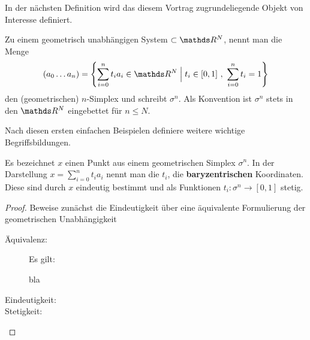 In der nächsten Definition wird das diesem Vortrag zugrundeliegende Objekt von Interesse definiert.

\begin{Def}
  Zu einem geometrisch unabhängigen System \gs $\subset \R^N$, nennt man die Menge
  \begin{gather*}
    (a_0 \ldots a_n) 
      =
    \set{\sum\limits_{i=0}^n t_i a_i \in \R^N}{ t_i \in [0,1] ~,~ \sum\limits_{i=0}^n t_i = 1}
  \end{gather*}
  den (geometrischen) $n$-Simplex und schreibt $\sigma^n$. Als Konvention 
  ist $\sigma^n$ stets in den $\R^N$ eingebettet für $n \leq N$.
\end{Def}


Nach diesen ersten einfachen Beispielen definiere weitere wichtige
Begriffsbildungen.

\begin{Lem}
  \normalfont Es bezeichnet $x$ einen Punkt aus einem geometrischen Simplex
  $\sigma^n$. In der Darstellung $x = \sum\limits_{i=0}^n t_i a_i$ nennt
  man die $t_i$, die \textbf{baryzentrischen} Koordinaten. Diese sind durch $x$
  eindeutig bestimmt und als Funktionen $t_i : \sigma^n \rightarrow [0,1]$ stetig.
  \begin{proof}
  	Beweise zunächst die Eindeutigkeit über eine äquivalente Formulierung der
  	geometrischen Unabhängigkeit 
  	\begin{description}
  		\item[Äquivalenz: ] Es gilt:
	  		\begin{Beh}
	  			bla
	  		\end{Beh}
  		\item[Eindeutigkeit: ] 
  		\item[Stetigkeit: ]
  	\end{description}
  \end{proof}
	
	
\end{Lem}

